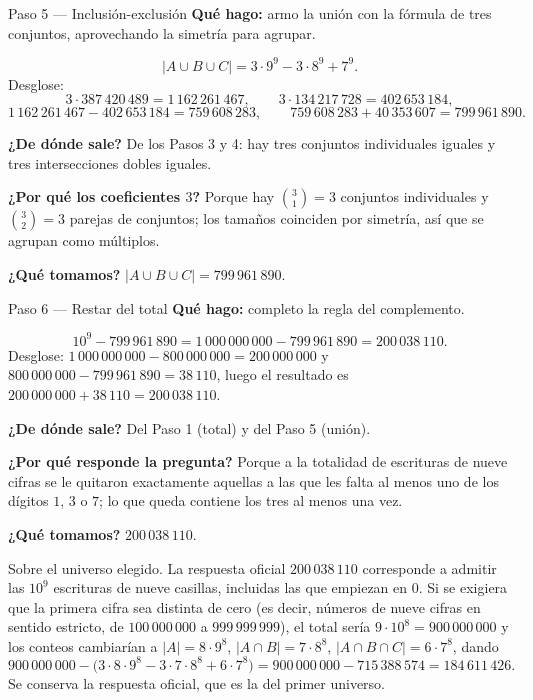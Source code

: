 \documentclass[11pt]{article}
\begin{document}
\begin{paso}{Paso 5 --- Inclusión-exclusión}
\textbf{Qué hago:} armo la unión con la fórmula de tres conjuntos, aprovechando la simetría para agrupar.

\[
|A\cup B\cup C| = 3\cdot 9^{9} - 3\cdot 8^{9} + 7^{9} .
\]
Desglose:
\[
3\cdot 387\,420\,489 = 1\,162\,261\,467,\qquad
3\cdot 134\,217\,728 = 402\,653\,184,
\]
\[
1\,162\,261\,467 - 402\,653\,184 = 759\,608\,283,\qquad
759\,608\,283 + 40\,353\,607 = 799\,961\,890 .
\]

\textbf{¿De dónde sale?} De los Pasos 3 y 4: hay tres conjuntos individuales iguales y tres intersecciones dobles iguales.

\textbf{¿Por qué los coeficientes $3$?} Porque hay $\binom{3}{1}=3$ conjuntos individuales y $\binom{3}{2}=3$ parejas de conjuntos; los tamaños coinciden por simetría, así que se agrupan como múltiplos.

\textbf{¿Qué tomamos?} $|A\cup B\cup C| = 799\,961\,890$.
\end{paso}

\begin{paso}{Paso 6 --- Restar del total}
\textbf{Qué hago:} completo la regla del complemento.

\[
10^{9} - 799\,961\,890 = 1\,000\,000\,000 - 799\,961\,890 = 200\,038\,110 .
\]
Desglose: $1\,000\,000\,000 - 800\,000\,000 = 200\,000\,000$ y $800\,000\,000-799\,961\,890 = 38\,110$, luego el resultado es $200\,000\,000+38\,110 = 200\,038\,110$.

\textbf{¿De dónde sale?} Del Paso 1 (total) y del Paso 5 (unión).

\textbf{¿Por qué responde la pregunta?} Porque a la totalidad de escrituras de nueve cifras se le quitaron exactamente aquellas a las que les falta al menos uno de los dígitos $1$, $3$ o $7$; lo que queda contiene los tres al menos una vez.

\textbf{¿Qué tomamos?} $200\,038\,110$.
\end{paso}

\begin{nota}
Sobre el universo elegido. La respuesta oficial $200\,038\,110$ corresponde a admitir las $10^9$ escrituras de nueve casillas, incluidas las que empiezan en $0$. Si se exigiera que la primera cifra sea distinta de cero (es decir, números de nueve cifras en sentido estricto, de $100\,000\,000$ a $999\,999\,999$), el total sería $9\cdot 10^8 = 900\,000\,000$ y los conteos cambiarían a $|A|=8\cdot 9^8$, $|A\cap B| = 7\cdot 8^8$, $|A\cap B\cap C| = 6\cdot 7^8$, dando
\[
900\,000\,000 - \bigl(3\cdot 8\cdot 9^{8} - 3\cdot 7\cdot 8^{8} + 6\cdot 7^{8}\bigr) = 900\,000\,000 - 715\,388\,574 = 184\,611\,426 .
\]
Se conserva la respuesta oficial, que es la del primer universo.
\end{nota}
\end{document}
